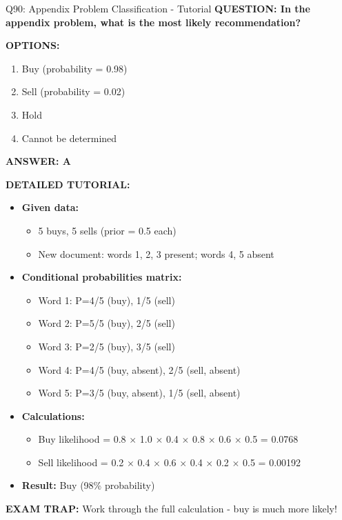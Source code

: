 \documentclass[8pt]{beamer}
\begin{document}
	\begin{frame}{Q90: Appendix Problem Classification - Tutorial}
		\fontsize{6.5}{7.5}\selectfont
		\textbf{QUESTION: In the appendix problem, what is the most likely recommendation?}
		
		\vspace{0.1cm}
		\textbf{OPTIONS:}
		\begin{enumerate}
			\item Buy (probability = 0.98)
			\item Sell (probability = 0.02)
			\item Hold
			\item Cannot be determined
		\end{enumerate}
		
		\vspace{0.1cm}
		\textcolor{myblue}{\textbf{ANSWER: A}}
		
		\vspace{0.1cm}
		\textbf{DETAILED TUTORIAL:}
		\begin{itemize}
			\item \textbf{Given data:}
			\begin{itemize}
				\item 5 buys, 5 sells (prior = 0.5 each)
				\item New document: words 1, 2, 3 present; words 4, 5 absent
			\end{itemize}
			\item \textbf{Conditional probabilities matrix:}
			\begin{itemize}
				\item Word 1: P=4/5 (buy), 1/5 (sell)
				\item Word 2: P=5/5 (buy), 2/5 (sell)
				\item Word 3: P=2/5 (buy), 3/5 (sell)
				\item Word 4: P=4/5 (buy, absent), 2/5 (sell, absent)
				\item Word 5: P=3/5 (buy, absent), 1/5 (sell, absent)
			\end{itemize}
			\item \textbf{Calculations:}
			\begin{itemize}
				\item Buy likelihood = 0.8 $\times$ 1.0 $\times$ 0.4 $\times$ 0.8 $\times$ 0.6 $\times$ 0.5 = 0.0768
				\item Sell likelihood = 0.2 $\times$ 0.4 $\times$ 0.6 $\times$ 0.4 $\times$ 0.2 $\times$ 0.5 = 0.00192
			\end{itemize}
			\item \textbf{Result:} Buy (98\% probability)
		\end{itemize}
		
		\textcolor{myred}{\textbf{EXAM TRAP:}} Work through the full calculation - \textcolor{myblue}{buy is much more likely}!
	\end{frame}
	
\end{document}
